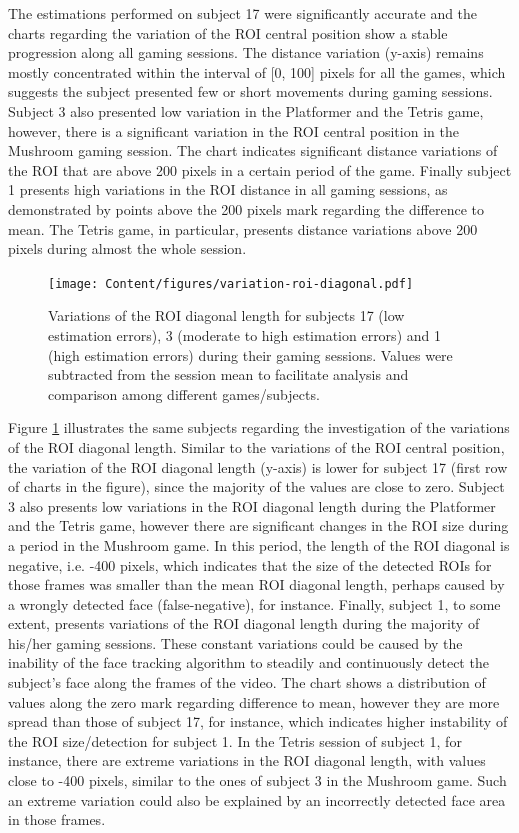 The estimations performed on subject 17 were significantly accurate and the charts regarding the variation of the ROI central position show a stable progression along all gaming sessions. The distance variation (y-axis) remains mostly concentrated within the interval of [0, 100] pixels for all the games, which suggests the subject presented few or short movements during gaming sessions. Subject 3 also presented low variation in the Platformer and the Tetris game, however, there is a significant variation in the ROI central position in the Mushroom gaming session. The chart indicates significant distance variations of the ROI that are above 200 pixels in a certain period of the game. Finally subject 1 presents high variations in the ROI distance in all gaming sessions, as demonstrated by points above the 200 pixels mark regarding the difference to mean. The Tetris game, in particular, presents distance variations above 200 pixels during almost the whole session.

\begin{figure}[!h]
\centering
\texttt{[image: Content/figures/variation-roi-diagonal.pdf]}
\caption{Variations of the ROI diagonal length for subjects 17 (low estimation errors), 3 (moderate to high estimation errors) and 1 (high estimation errors) during their gaming sessions. Values were subtracted from the session mean to facilitate analysis and comparison among different games/subjects.}
\label{fig:chart-roi-anomalies-diagonal}
\end{figure}

Figure \ref{fig:chart-roi-anomalies-diagonal} illustrates the same subjects regarding the investigation of the variations of the ROI diagonal length. Similar to the variations of the ROI central position, the variation of the ROI diagonal length (y-axis) is lower for subject 17 (first row of charts in the figure), since the majority of the values are close to zero. Subject 3 also presents low variations in the ROI diagonal length during the Platformer and the Tetris game, however there are significant changes in the ROI size during a period in the Mushroom game. In this period, the length of the ROI diagonal is negative, i.e. -400 pixels, which indicates that the size of the detected ROIs for those frames was smaller than the mean ROI diagonal length, perhaps caused by a wrongly detected face (false-negative), for instance. Finally, subject 1, to some extent, presents variations of the ROI diagonal length during the majority of his/her gaming sessions. These constant variations could be caused by the inability of the face tracking algorithm to steadily and continuously detect the subject's face along the frames of the video. The chart shows a distribution of values along the zero mark regarding difference to mean, however they are more spread than those of subject 17, for instance, which indicates higher instability of the ROI size/detection for subject 1. In the Tetris session of subject 1, for instance, there are extreme variations in the ROI diagonal length, with values close to -400 pixels, similar to the ones of subject 3 in the Mushroom game. Such an extreme variation could also be explained by an incorrectly detected face area in those frames.

